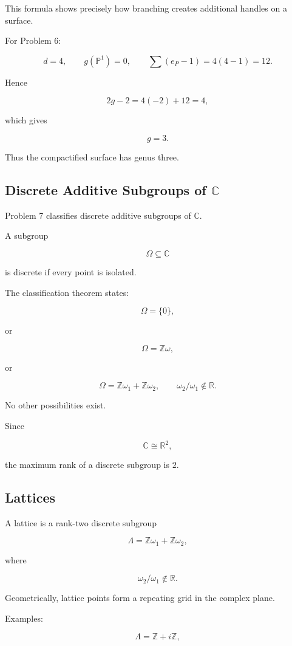 \documentclass[12pt,a4paper]{article}
\theoremstyle{notespace}
\begin{document}
This formula shows precisely how branching creates additional handles on a surface.

For Problem 6:

\[
d=4,
\qquad
g(\mathbb P^1)=0,
\qquad
\sum(e_P-1)=4(4-1)=12.
\]

Hence

\[
2g-2=4(-2)+12=4,
\]

which gives

\[
g=3.
\]

Thus the compactified surface has genus three.

\subsection{Discrete Additive Subgroups of \(\mathbb C\)}

Problem 7 classifies discrete additive subgroups of \(\mathbb C\).

A subgroup

\[
\Omega\subseteq\mathbb C
\]

is discrete if every point is isolated.

The classification theorem states:

\[
\Omega=\{0\},
\]

or

\[
\Omega=\mathbb Z\omega,
\]

or

\[
\Omega=\mathbb Z\omega_1+\mathbb Z\omega_2,
\qquad
\omega_2/\omega_1\notin\mathbb R.
\]

No other possibilities exist.

Since

\[
\mathbb C\cong\mathbb R^2,
\]

the maximum rank of a discrete subgroup is \(2\).

\subsection{Lattices}

A lattice is a rank-two discrete subgroup

\[
\Lambda
=
\mathbb Z\omega_1
+
\mathbb Z\omega_2,
\]

where

\[
\omega_2/\omega_1\notin\mathbb R.
\]

Geometrically, lattice points form a repeating grid in the complex plane.

Examples:

\[
\Lambda=\mathbb Z+i\mathbb Z,
\]
\end{document}
